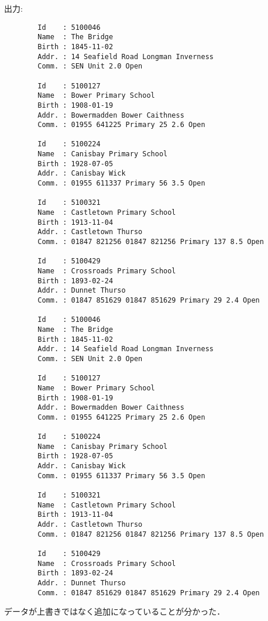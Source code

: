         出力:
        \begin{verbatim}
        Id    : 5100046
        Name  : The Bridge
        Birth : 1845-11-02
        Addr. : 14 Seafield Road Longman Inverness
        Comm. : SEN Unit 2.0 Open

        Id    : 5100127
        Name  : Bower Primary School
        Birth : 1908-01-19
        Addr. : Bowermadden Bower Caithness
        Comm. : 01955 641225 Primary 25 2.6 Open

        Id    : 5100224
        Name  : Canisbay Primary School
        Birth : 1928-07-05
        Addr. : Canisbay Wick
        Comm. : 01955 611337 Primary 56 3.5 Open

        Id    : 5100321
        Name  : Castletown Primary School
        Birth : 1913-11-04
        Addr. : Castletown Thurso
        Comm. : 01847 821256 01847 821256 Primary 137 8.5 Open

        Id    : 5100429
        Name  : Crossroads Primary School
        Birth : 1893-02-24
        Addr. : Dunnet Thurso
        Comm. : 01847 851629 01847 851629 Primary 29 2.4 Open

        Id    : 5100046
        Name  : The Bridge
        Birth : 1845-11-02
        Addr. : 14 Seafield Road Longman Inverness
        Comm. : SEN Unit 2.0 Open

        Id    : 5100127
        Name  : Bower Primary School
        Birth : 1908-01-19
        Addr. : Bowermadden Bower Caithness
        Comm. : 01955 641225 Primary 25 2.6 Open

        Id    : 5100224
        Name  : Canisbay Primary School
        Birth : 1928-07-05
        Addr. : Canisbay Wick
        Comm. : 01955 611337 Primary 56 3.5 Open

        Id    : 5100321
        Name  : Castletown Primary School
        Birth : 1913-11-04
        Addr. : Castletown Thurso
        Comm. : 01847 821256 01847 821256 Primary 137 8.5 Open

        Id    : 5100429
        Name  : Crossroads Primary School
        Birth : 1893-02-24
        Addr. : Dunnet Thurso
        Comm. : 01847 851629 01847 851629 Primary 29 2.4 Open
        \end{verbatim}
    データが上書きではなく追加になっていることが分かった．

